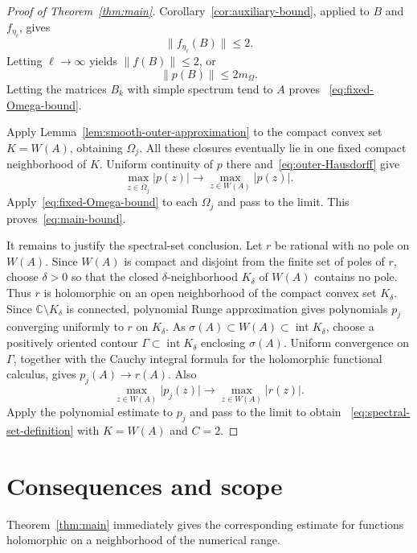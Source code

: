 \documentclass[preprints,article,submit,oneauthor]{Definitions/mdpi}
\theoremstyle{mdpi}
\theoremstyle{definition}
\newcommand{\C}{\mathbb C}
\begin{document}
\begin{proof}[Proof of Theorem~\ref{thm:main}]
Corollary~\ref{cor:auxiliary-bound}, applied to $B$ and
$f_{\eta_\ell}$, gives
\[
  \lVert f_{\eta_\ell}(B)\rVert\leq2.
\]
Letting $\ell\to\infty$ yields $\lVert f(B)\rVert\leq2$, or
\begin{equation}
  \lVert p(B)\rVert\leq2m_\Omega.
  \label{eq:B-Omega-bound}
\end{equation}
Letting the matrices $B_k$ with simple spectrum tend to $A$ proves~%
\eqref{eq:fixed-Omega-bound}.

Apply Lemma~\ref{lem:smooth-outer-approximation} to the compact convex
set $K=W(A)$, obtaining $\Omega_j$.  All these closures eventually
lie in one fixed compact neighborhood of $K$.  Uniform continuity of
$p$ there and~\eqref{eq:outer-Hausdorff} give
\begin{equation}
  \max_{z\in\overline\Omega_j}\lvert p(z)\rvert
  \longrightarrow
  \max_{z\in W(A)}\lvert p(z)\rvert.
  \label{eq:maxima-converge}
\end{equation}
Apply~\eqref{eq:fixed-Omega-bound} to each $\Omega_j$ and pass to the
limit.  This proves~\eqref{eq:main-bound}.

It remains to justify the spectral-set conclusion.  Let $r$ be
rational with no pole on $W(A)$.  Since $W(A)$ is compact and disjoint
from the finite set of poles of $r$, choose $\delta>0$ so that the
closed $\delta$-neighborhood $K_\delta$ of $W(A)$ contains no pole.
Thus $r$ is holomorphic on an open neighborhood of the compact convex
set $K_\delta$.  Since $\C\setminus K_\delta$ is connected, polynomial
Runge approximation gives polynomials $p_j$ converging uniformly to
$r$ on $K_\delta$.  As
$\sigma(A)\subset W(A)\subset\operatorname{int}K_\delta$, choose a
positively oriented contour $\Gamma\subset\operatorname{int}K_\delta$
enclosing $\sigma(A)$.  Uniform convergence on $\Gamma$, together with
the Cauchy integral formula for the holomorphic functional calculus,
gives $p_j(A)\to r(A)$.  Also
\[
  \max_{z\in W(A)}\lvert p_j(z)\rvert
  \longrightarrow
  \max_{z\in W(A)}\lvert r(z)\rvert.
\]
Apply the polynomial estimate to $p_j$ and pass to the limit to obtain~%
\eqref{eq:spectral-set-definition} with $K=W(A)$ and $C=2$.
\end{proof}

\section{Consequences and scope}
\label{sec:consequences}

Theorem~\ref{thm:main} immediately gives the corresponding estimate for
functions holomorphic on a neighborhood of the numerical range.
\end{document}
